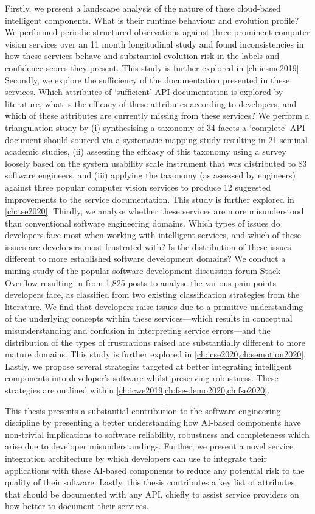 Firstly, we present a landscape analysis of the nature of these cloud-based intelligent components. What is their runtime behaviour and evolution profile? We performed periodic structured observations against three prominent computer vision services over an 11 month longitudinal study and found inconsistencies in how these services behave and substantial evolution risk in the labels and confidence scores they present. This study is further explored in \cref{ch:icsme2019}.
Secondly, we explore the sufficiency of the documentation presented in these services. Which attributes of `sufficient' API documentation is explored by literature, what is the efficacy of these attributes according to developers, and which of these attributes are currently missing from these services? We perform a triangulation study by (i) synthesising a taxonomy of 34 facets a `complete' API document should sourced via a systematic mapping study resulting in 21 seminal academic studies, (ii) assessing the efficacy of this taxonomy using a survey loosely based on the system usability scale instrument that was distributed to 83 software engineers, and (iii) applying the taxonomy (as assessed by engineers) against three popular computer vision services to produce 12 suggested improvements to the service documentation. This study is further explored in \cref{ch:tse2020}.
Thirdly, we analyse whether these services are more misunderstood than conventional software engineering domains. Which types of issues do developers face most when working with intelligent services, and which of these issues are developers most frustrated with? Is the distribution of these issues different to more established software development domains? We conduct a mining study of the popular software development discussion forum Stack Overflow resulting in from 1,825 posts to analyse the various pain-points developers face, as classified from two existing classification strategies from the literature. We find that developers raise issues due to a primitive understanding of the underlying concepts within these services---which results in conceptual misunderstanding and confusion in interpreting service errors---and the distribution of the types of frustrations raised are substantially different to more mature domains. This study is further explored in \cref{ch:icse2020,ch:semotion2020}.
Lastly, we propose several strategies targeted at better integrating intelligent components into developer's software whilst preserving robustness. These strategies are outlined within \cref{ch:icwe2019,ch:fse-demo2020,ch:fse2020}.

This thesis presents a substantial contribution to the software engineering discipline by presenting a better understanding how AI-based components have non-trivial implications to software reliability, robustness and completeness which arise due to developer misunderstandings. Further, we present a novel service integration architecture by which developers can use to integrate their applications with these AI-based components to reduce any potential risk to the quality of their software. Lastly, this thesis contributes a key list of attributes that should be documented with any API, chiefly to assist service providers on how better to document their services. 